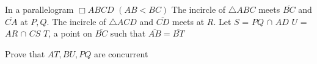 In a parallelogram $\Box ABCD$ $(AB < BC)$
The incircle of $\triangle ABC$ meets $\overline {BC}$ and $\overline {CA}$ at $P, Q$.
The incircle of $\triangle ACD$ and $\overline {CD}$ meets at $R$.
Let $S$ = $PQ$ $\cap$ $AD$
$U$ = $AR$ $\cap$ $CS$
$T$, a point on $\overline {BC}$ such that $\overline {AB} = \overline {BT}$

Prove that $AT, BU, PQ$ are concurrent